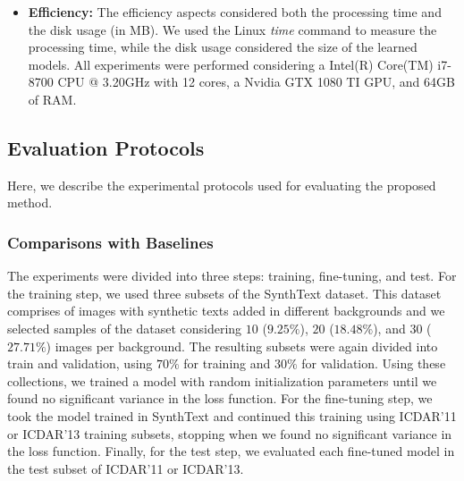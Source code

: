 \begin{itemize}
\item {\bf Efficiency:} The efficiency aspects considered both the processing time and the disk usage (in MB). We used the Linux {\em time} command to measure the processing time, %
while the disk usage considered the size of the learned models. %
All experiments were performed considering a Intel(R) Core(TM) i7-8700 CPU @ 3.20GHz with 12 cores, a Nvidia GTX 1080 TI GPU, and 64GB of RAM.
\end{itemize}

\subsection{Evaluation Protocols}
\label{sec:protocols}

Here, we describe the experimental protocols used for evaluating the proposed method. 

\subsubsection{Comparisons with Baselines}

The experiments were divided into three steps: training, fine-tuning, and test. For the training step, we used three subsets of the SynthText dataset. This dataset comprises of images with synthetic texts added in different backgrounds and we selected samples of the dataset considering $10$ ($9.25\%$), $20$ ($18.48\%$), and $30$ ($27.71\%$) images per background. The resulting subsets were again divided into train and validation, using $70\%$ for training and $30\%$ for validation. Using these collections, we trained a model with random initialization parameters until we found no significant variance in the loss function. For the fine-tuning step, we took the model trained in SynthText and continued this training using ICDAR'11 or ICDAR'13 training subsets, stopping when we found no significant variance in the loss function. Finally, for the test step, we evaluated each fine-tuned model in the test subset of ICDAR'11 or ICDAR'13.

